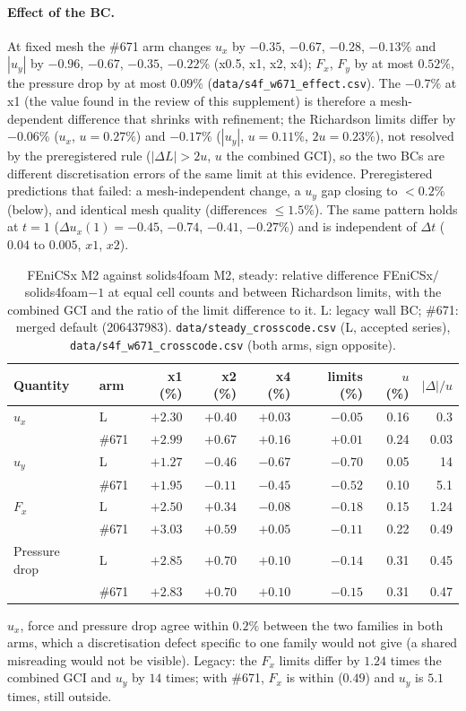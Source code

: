 \documentclass[sn-mathphys,Numbered]{sn-jnl}
\begin{document}
\paragraph{Effect of the BC.}
At fixed mesh the \#671 arm changes $u_x$ by $-0.35$, $-0.67$, $-0.28$, $-0.13\%$ and $|u_y|$ by $-0.96$, $-0.67$, $-0.35$, $-0.22\%$ (x0.5, x1, x2, x4); $F_x$, $F_y$ by at most $0.52\%$, the pressure drop by at most $0.09\%$ (\texttt{data/s4f\_w671\_effect.csv}).
The $-0.7\%$ at x1 (the value found in the review of this supplement) is therefore a mesh-dependent difference that shrinks with refinement; the Richardson limits differ by $-0.06\%$ ($u_x$, $u=0.27\%$) and $-0.17\%$ ($|u_y|$, $u=0.11\%$, $2u=0.23\%$), not resolved by the preregistered rule ($|\Delta L|>2u$, $u$ the combined GCI), so the two BCs are different discretisation errors of the same limit at this evidence.
Preregistered predictions that failed: a mesh-independent change, a $u_y$ gap closing to $<0.2\%$ (below), and identical mesh quality (differences $\le1.5\%$).
The same pattern holds at $t=1$ ($\Delta u_x(1)=-0.45$, $-0.74$, $-0.41$, $-0.27\%$) and is independent of $\Delta t$ ($0.04$ to $0.005$, $x1$, $x2$).

\begin{table}[htbp]
\centering
\caption{FEniCSx M2 against solids4foam M2, steady: relative difference FEniCSx$/$solids4foam$-1$ at equal cell counts and between Richardson limits, with the combined GCI and the ratio of the limit difference to it. L: legacy wall BC; \#671: merged default (206437983). \texttt{data/steady\_crosscode.csv} (L, accepted series), \texttt{data/s4f\_w671\_crosscode.csv} (both arms, sign opposite).}\label{tab:fx_crosscode}
\small
\begin{tabular}{@{}llrrrrrr@{}}
\toprule
Quantity & arm & x1 (\%) & x2 (\%) & x4 (\%) & limits (\%) & $u$ (\%) & $|\Delta|/u$ \\
\midrule
$u_x$ & L & $+2.30$ & $+0.40$ & $+0.03$ & $-0.05$ & 0.16 & 0.3 \\
 & \#671 & $+2.99$ & $+0.67$ & $+0.16$ & $+0.01$ & 0.24 & 0.03 \\
$u_y$ & L & $+1.27$ & $-0.46$ & $-0.67$ & $-0.70$ & 0.05 & 14 \\
 & \#671 & $+1.95$ & $-0.11$ & $-0.45$ & $-0.52$ & 0.10 & 5.1 \\
$F_x$ & L & $+2.50$ & $+0.34$ & $-0.08$ & $-0.18$ & 0.15 & 1.24 \\
 & \#671 & $+3.03$ & $+0.59$ & $+0.05$ & $-0.11$ & 0.22 & 0.49 \\
Pressure drop & L & $+2.85$ & $+0.70$ & $+0.10$ & $-0.14$ & 0.31 & 0.45 \\
 & \#671 & $+2.83$ & $+0.70$ & $+0.10$ & $-0.15$ & 0.31 & 0.47 \\
\bottomrule
\end{tabular}
\end{table}
$u_x$, force and pressure drop agree within $0.2\%$ between the two families in both arms, which a discretisation defect specific to one family would not give (a shared misreading would not be visible).
Legacy: the $F_x$ limits differ by $1.24$ times the combined GCI and $u_y$ by $14$ times; with \#671, $F_x$ is within ($0.49$) and $u_y$ is $5.1$ times, still outside.
\end{document}
